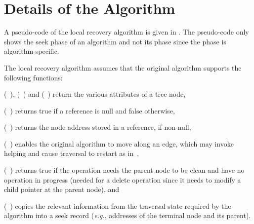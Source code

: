 \section{Details of the Algorithm}
\label{sec:description}




A pseudo-code of the local recovery algorithm is given in .
The pseudo-code only shows the seek phase of an algorithm and not its \action{} phase since the \action{} phase is algorithm-specific. 

The local recovery algorithm assumes that the original algorithm supports the following functions:
\begin{enumerate*}[label=(\alph*)]
\item \GetKey(~), \IsMarked(~) and \GetChild(~) return the various attributes of a tree node,
\item \IsNull(~) returns true if a reference is null and false otherwise,
\item \GetAddress(~) returns the node address stored in a reference, if non-null,
\item \Move(~) enables the original algorithm to move along an edge, which may invoke helping and cause traversal to restart as in~\cite{HowJon:2012:SPAA},
\item \NeedCleanParentNode(~) returns true if the operation needs the parent node to be clean and have no operation in progress (needed for a delete operation since it needs to modify a child pointer at the parent node), and
\item \PopulateSeekRecord(~) copies the relevant information from the traversal state required by the algorithm into a seek record (\emph{e.g.}, addresses of the terminal node and its parent).
\end{enumerate*}


